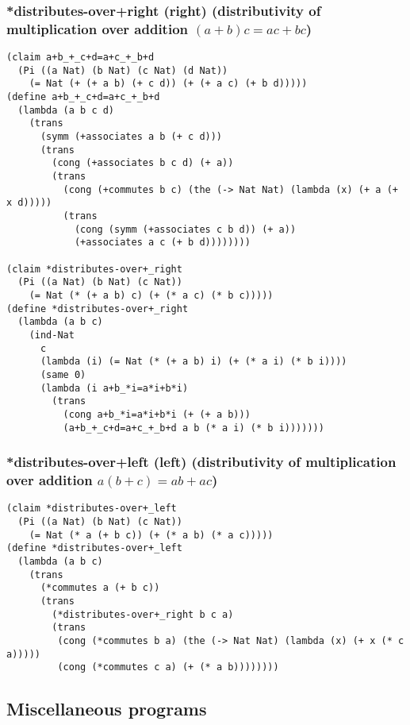 \subsubsection{*distributes-over+right (right) (distributivity of multiplication over addition \((a + b)c = ac + bc\))} \label{code:*distributes-over+right}
\begin{verbatim}
(claim a+b_+_c+d=a+c_+_b+d
  (Pi ((a Nat) (b Nat) (c Nat) (d Nat))
    (= Nat (+ (+ a b) (+ c d)) (+ (+ a c) (+ b d)))))
(define a+b_+_c+d=a+c_+_b+d
  (lambda (a b c d)
    (trans
      (symm (+associates a b (+ c d)))
      (trans
        (cong (+associates b c d) (+ a))
        (trans
          (cong (+commutes b c) (the (-> Nat Nat) (lambda (x) (+ a (+ x d)))))
          (trans
            (cong (symm (+associates c b d)) (+ a))
            (+associates a c (+ b d))))))))

(claim *distributes-over+_right
  (Pi ((a Nat) (b Nat) (c Nat))
    (= Nat (* (+ a b) c) (+ (* a c) (* b c)))))
(define *distributes-over+_right
  (lambda (a b c)
    (ind-Nat
      c
      (lambda (i) (= Nat (* (+ a b) i) (+ (* a i) (* b i))))
      (same 0)
      (lambda (i a+b_*i=a*i+b*i)
        (trans
          (cong a+b_*i=a*i+b*i (+ (+ a b)))
          (a+b_+_c+d=a+c_+_b+d a b (* a i) (* b i)))))))
\end{verbatim}

\subsubsection{*distributes-over+left (left) (distributivity of multiplication over addition \(a(b + c) = ab + ac\))} \label{code:*distributes-over+left}
\begin{verbatim}
(claim *distributes-over+_left
  (Pi ((a Nat) (b Nat) (c Nat))
    (= Nat (* a (+ b c)) (+ (* a b) (* a c)))))
(define *distributes-over+_left
  (lambda (a b c)
    (trans
      (*commutes a (+ b c))
      (trans
        (*distributes-over+_right b c a)
        (trans
         (cong (*commutes b a) (the (-> Nat Nat) (lambda (x) (+ x (* c a)))))
         (cong (*commutes c a) (+ (* a b))))))))
\end{verbatim}


\subsection{Miscellaneous programs}


